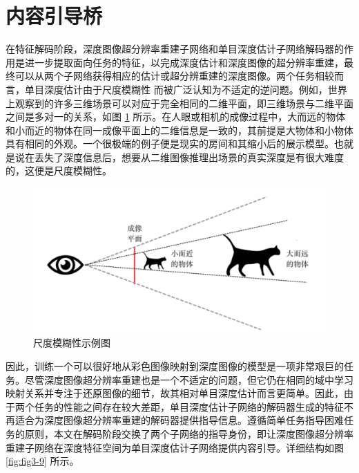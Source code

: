 \section{内容引导桥}

在特征解码阶段，深度图像超分辨率重建子网络和单目深度估计子网络解码器的作用是进一步提取面向任务的特征，以完成深度估计和深度图像的超分辨率重建，最终可以从两个子网络获得相应的估计或超分辨重建的深度图像。两个任务相较而言，单目深度估计由于尺度模糊性 \cite{DBLP:conf/nips/EigenPF14} 而被广泛认知为不适定的逆问题。例如，世界上观察到的许多三维场景可以对应于完全相同的二维平面，即三维场景与二维平面之间是多对一的关系，如图 \ref{fig:fig3-8} 所示。在人眼或相机的成像过程中，大而远的物体和小而近的物体在同一成像平面上的二维信息是一致的，其前提是大物体和小物体具有相同的外观。一个很极端的例子便是现实的房间和其缩小后的展示模型。也就是说在丢失了深度信息后，想要从二维图像推理出场景的真实深度是有很大难度的，这便是尺度模糊性。

\begin{figure}[!htbp]
	\centering
	\includegraphics{figures/25.png}
	\caption{尺度模糊性示例图}
	\label{fig:fig3-8}
	\vspace{-0.8cm}  %
\end{figure}

因此，训练一个可以很好地从彩色图像映射到深度图像的模型是一项非常艰巨的任务。尽管深度图像超分辨率重建也是一个不适定的问题，但它仍在相同的域中学习映射关系并专注于还原图像的细节，故其相对单目深度估计而言更简单。因此，由于两个任务的性能之间存在较大差距，单目深度估计子网络的解码器生成的特征不再适合为深度图像超分辨率重建的解码器提供指导信息。遵循简单任务指导困难任务的原则，本文在解码阶段交换了两个子网络的指导身份，即让深度图像超分辨率重建子网络在深度特征空间为单目深度估计子网络提供内容引导。详细结构如图 \ref{fig:fig3-9} 所示。

